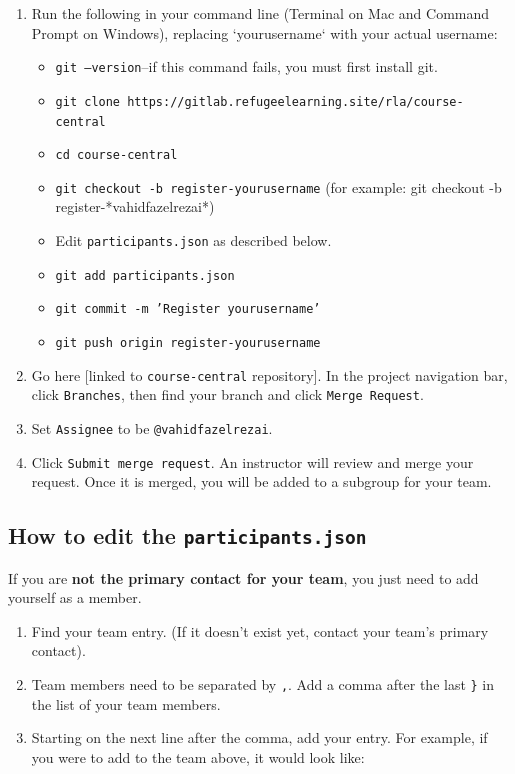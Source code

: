 \documentclass[12pt,twoside]{mitthesis}
\begin{document}
\begin{enumerate}
\item Run the following in your command line (Terminal on Mac and Command Prompt on Windows), replacing `yourusername` with your actual username:
\begin{itemize}
    \item \texttt{git --version}--if this command fails, you must first install git.
    \item \texttt{git clone https://gitlab.refugeelearning.site/rla/course-central}
    \item \texttt{cd course-central}
    \item \texttt{git checkout -b register-yourusername} (for example: git checkout -b register-*vahidfazelrezai*)
    \item Edit \texttt{participants.json} as described below.
    \item \texttt{git add participants.json}
    \item \texttt{git commit -m 'Register yourusername'}
    \item \texttt{git push origin register-yourusername}
\end{itemize}
\item Go here [linked to \texttt{course-central} repository]. In the project navigation bar, click \texttt{Branches}, then find your branch and click \texttt{Merge Request}.
\item Set \texttt{Assignee} to be \texttt{@vahidfazelrezai}.
\item Click \texttt{Submit merge request}. An instructor will review and merge your request. Once it is merged, you will be added to a subgroup for your team.
\end{enumerate}

\subsection*{How to edit the \texttt{participants.json}}

If you are \textbf{not the primary contact for your team}, you just need to add yourself as a member.

\begin{enumerate}
\item Find your team entry. (If it doesn't exist yet, contact your team's primary contact).
\item Team members need to be separated by \texttt{,}. Add a comma after the last \texttt{\}} in the list of your team members.
\item Starting on the next line after the comma, add your entry. For example, if you were to add to the team above, it would look like:
\end{enumerate}
\end{document}
